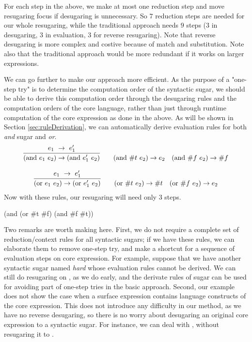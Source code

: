 For each step in the above, we make at most one reduction step and move resugaring focus if desugaring is unnecessary. So $7$ reduction steps are needed for our whole resugaring, while the traditional approach needs $9$ steps ($3$ in desugaring, $3$ in evaluation, $3$ for reverse resugaring). Note that reverse desugaring is more complex and costive because of match and substitution. Note also that the traditional approach would be more redundant if it works on larger expressions.

We can go further to make our approach more efficient. As the purpose of a "one-step try" is to determine the computation order of the syntactic sugar, we should be able to derive this computation order through the desugaring rules and the computation orders of the core language, rather than just through runtime computation of the core expression as done in the above. As will be shown in Section \ref{sec:ruleDerivation}, we can automatically derive evaluation rules  for both \emph{and} sugar and \emph{or}.
\[
\begin{array}{c}
\infer {(\mbox{and}~e_1~e_2) \rightarrow (\mbox{and}~e_1'~e_2)} {e_1~ \rightarrow~e_1'}
\qquad
(\mbox{and}~\#t~e_2) \rightarrow e_2
\quad
(\mbox{and}~\#f~e_2) \rightarrow \#f \\
\\
\infer {(\mbox{or}~e_1~e_2) \rightarrow (\mbox{or}~e_1'~e_2)} {e_1~ \rightarrow~e_1'}
\qquad
(\mbox{or}~\#t~e_2) \rightarrow \#t
\quad
(\mbox{or}~\#f~e_2) \rightarrow e_2 \\
\end{array}
\]
Now with these rules, our resugaring will need only $3$ steps.
\begin{Codes}
    (and (or \#t \#f) (and \#f \#t))
\end{Codes}

Two remarks are worth making here. First, we do not require a complete set of reduction/context rules for all syntactic sugars; if we have these rules, we can elaborate them to remove one-step try, and make a shortcut for a sequence of evaluation steps on core expression.
For example, suppose that we have another syntactic sugar named \emph{hard} whose evaluation rules cannot be derived.
We can still do resugaring on , as we do early, and the derivate rules of  sugar can be used for avoiding part of one-step tries in the basic approach.
Second, our example does not show the case when a surface expression contains language constructs of the core expression. This does not introduce any difficulty in our method, as we have no reverse desugaring, so there is no worry about desugaring an original core expression to a syntactic sugar. For instance, we can deal with , without resugaring it to .


